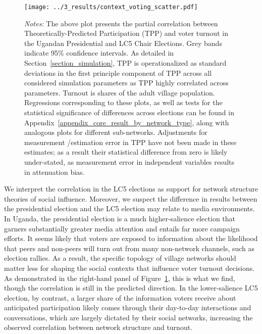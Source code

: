 \documentclass[12pt]{article}
\begin{document}
\vspace*{-0.1cm}
\begin{figure}
	\begin{center}
	    \caption{}\label{figure_social_context_scatter}
    		\texttt{[image: ../3\_results/context\_voting\_scatter.pdf]}
    \end{center}
	\scriptsize{\emph{Notes:}  The above plot presents the partial correlation between Theoretically-Predicted Participation (TPP) and voter turnout in the Ugandan Presidential and LC5 Chair Elections.  Grey bands indicate 95\% confidence intervals.  As detailed in Section~\ref{section_simulation}, TPP is operationalized as standard deviations in the first principle component of TPP across all considered simulation parameters as TPP highly correlated across parameters. Turnout is shares of the adult village population. Regressions corresponding to these plots, as well as tests for the statistical significance of differences across elections can be found in Appendix~\ref{appendix_core_result_by_network_type}, along with analogous plots for different sub-networks. Adjustments for measurement /estimation error in TPP have not been made in these estimates; as a result their statistical difference from zero is likely under-stated, as measurement error in independent variables results in attenuation bias.}
\end{figure}

We interpret the correlation in the LC5 elections as support for network structure theories of social influence. Moreover, we suspect the difference in results between the presidential election and the LC5 election may relate to media environments. In Uganda, the presidential election is a much higher-salience election that garners substantially greater media attention and entails far more campaign efforts. It seems likely that voters are exposed to information about the likelihood that peers and non-peers will turn out from many non-network channels, such as election rallies. As a result, the specific topology of village networks should matter less for shaping the social contexts that influence voter turnout decisions.  As demonstrated in the right-hand panel of Figure~\ref{figure_social_context_scatter}, this is what we find, though the correlation is still in the predicted direction. In the lower-salience LC5 election, by contrast, a larger share of the information voters receive about anticipated participation likely comes through their day-to-day interactions and conversations, which are largely dictated by their social networks, increasing the observed correlation between network structure and turnout.
\end{document}
